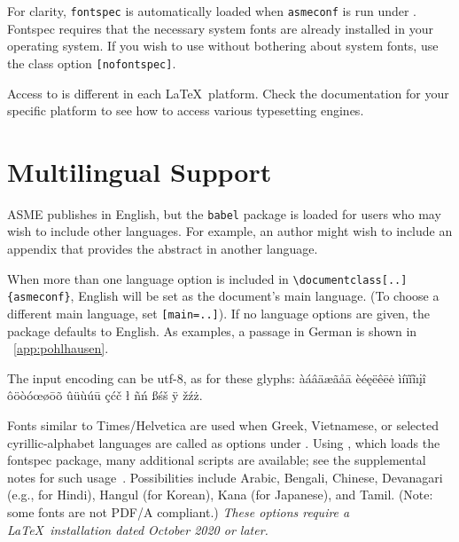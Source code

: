 \documentclass[captionpatch,colorlinks,upint,subscriptcorrection,varvw,german]{asmeconf}
\begin{document}
For clarity, \texttt{fontspec} is automatically loaded when \texttt{asmeconf} is run under . Fontspec requires that the necessary system fonts are already installed in your operating system.  If you wish to use  without bothering about system fonts, use the class option \texttt{[nofontspec]}. 

Access to  is different in each \LaTeX\ platform.  Check the documentation for your specific platform to see how to access various typesetting engines.

\section{Multilingual Support}\label{appendix:c}

ASME publishes in English, but the \texttt{babel} package is loaded for 
users who may wish to include other languages. For example, an author might wish to include an appendix that provides the 
abstract in another language.

When more than one language option is included in \verb|\documentclass[..]{asmeconf}|, English will be 
set as the document's main language. (To choose a different main language, set \texttt{[main=..]}).
If no language options are given, the package defaults to English.  As examples, a passage in German is 
shown in  \appendixname~\ref{app:pohlhausen}.

The input encoding can be utf-8, as for these glyphs:
%
àáâäæãåā èéęëêēė ìíïǐĩıįî ôöòóœøōõ ûüùúū çćč ł ñń ßśš ÿ žźż.

Fonts similar to Times/Helvetica are used when Greek, Vietnamese, or selected cyrillic-alphabet languages are called as options under {\upshape{}}. Using {\upshape{}}, which loads the fontspec package, many additional scripts are available; see the supplemental notes for such usage~\cite{lienhard2021}. Possibilities include Arabic, Bengali, Chinese, Devanagari (e.g., for Hindi), Hangul (for Korean), Kana (for Japanese), and Tamil. (Note: some fonts are not PDF/A compliant.) \textit{These options require a \LaTeX\ installation dated October 2020 or later.}
\end{document}
